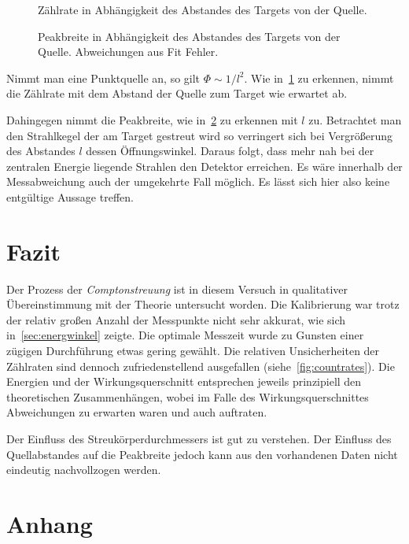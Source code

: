 \documentclass[slug=CS, room=Andreas-Schubert-Bau\,\ Labor\ 406,
supervisor=Juliane\ Volkmer, coursedate=29.\ 11.\ 2019]{../../Lab_Report_LaTeX/lab_report}
\newcommand{\cs}{\emph{Comptonstreuung }}
\begin{document}
\begin{figure}[h]\centering
  
  \caption{Zählrate in Abhängigkeit des Abstandes des Targets von der Quelle.}
  \label{fig:dists-countrates}
\end{figure}

\begin{figure}[h]\centering
  
  \caption{Peakbreite in Abhängigkeit des Abstandes des Targets von
    der Quelle. Abweichungen aus Fit Fehler.}
  \label{fig:dists-widths}
\end{figure}

Nimmt man eine Punktquelle an, so gilt \(\Phi\sim 1/l^2\). Wie
in~\ref{fig:dists-countrates} zu erkennen, nimmt die Zählrate mit dem
Abstand der Quelle zum Target wie erwartet ab.

Dahingegen nimmt die Peakbreite, wie in~\ref{fig:dists-widths} zu
erkennen mit \(l\) zu. Betrachtet man den Strahlkegel der am Target
gestreut wird so verringert sich bei Vergr\"o\ss{}erung des Abstandes
\(l\) dessen \"Offnungswinkel. Daraus folgt, dass mehr nah bei der
zentralen Energie liegende Strahlen den Detektor erreichen. Es w\"are
innerhalb der Messabweichung auch der umgekehrte Fall m\"oglich. Es
l\"asst sich hier also keine entg\"ultige Aussage treffen.

\section{Fazit}
Der Prozess der \cs ist in diesem Versuch in qualitativer
Übereinstimmung mit der Theorie untersucht worden. Die Kalibrierung
war trotz der relativ gro\ss{}en Anzahl der Messpunkte nicht sehr akkurat,
wie sich in~\ref{sec:energwinkel} zeigte. Die optimale Messzeit wurde
zu Gunsten einer z\"ugigen Durchf\"uhrung etwas gering gew\"ahlt. Die
relativen Unsicherheiten der Zählraten sind dennoch zufriedenstellend
ausgefallen (siehe~\ref{fig:countrates}). Die Energien und der
Wirkungsquerschnitt entsprechen jeweils prinzipiell den theoretischen
Zusammenh\"angen, wobei im Falle des Wirkungsquerschnittes
Abweichungen zu erwarten waren und auch auftraten.

Der Einfluss des Streukörperdurchmessers ist gut zu verstehen. Der
Einfluss des Quellabstandes auf die Peakbreite jedoch kann aus den
vorhandenen Daten nicht eindeutig nachvollzogen werden.

\section{Anhang}
\label{sec:anshang}
\end{document}
